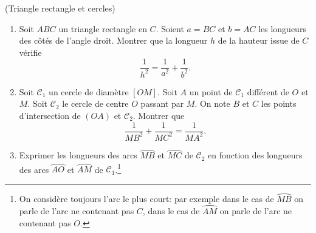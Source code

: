 \documentclass[a4paper,12pt,reqno]{amsart}
\begin{document}
\begin{exo} (Triangle rectangle et cercles)

  \begin{enumerate}
    \item Soit $ABC$ un triangle rectangle en $C$. Soient $a=BC$ et $b=AC$ les longueurs des côtés de l'angle droit. Montrer que la longueur $h$ de la hauteur issue de $C$ vérifie
    \[
      \frac{1}{h^2}=\frac{1}{a^2}+\frac{1}{b^2}.
    \]
    \item Soit $\mathcal{C}_1$ un cercle de diamètre $[OM]$. Soit $A$ un point de $\mathcal{C}_1$ différent de $O$ et $M$. Soit $\mathcal{C}_2$ le cercle de centre $O$ passant par $M$. On note $B$ et $C$ les points d'intersection de $(OA)$ et $\mathcal{C}_2$. Montrer que
    \[
      \frac{1}{MB^2} +\frac{1}{MC^2} = \frac{1}{MA^2}.
    \]
    \item Exprimer les longueurs des arcs $\wideparen{MB}$ et $\wideparen{MC}$ de $\mathcal{C}_2$ en fonction des longueurs des arcs $\wideparen{AO}$ et $\wideparen{AM}$ de $\mathcal{C}_1$.\footnote{On considère toujours l'arc le plus court: par exemple dans le cas de $\wideparen{MB}$ on parle de l'arc ne contenant pas $C$, dans le cas de $\wideparen{AM}$ on parle de l'arc ne contenant pas $O$.}
  \end{enumerate}
\end{exo}
\end{document}
